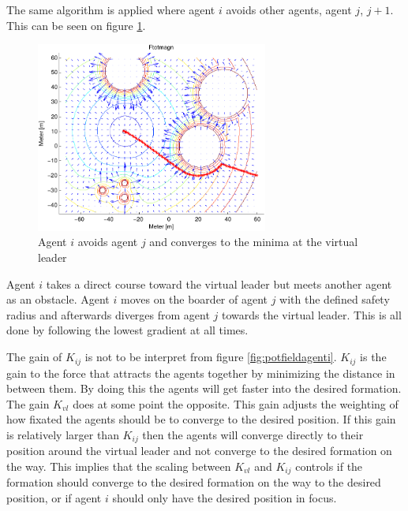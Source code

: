\documentclass[conference]{IEEEtran}
\newcommand{\colwidth}{3in}
\begin{document}

The same algorithm is applied where agent $i$ avoids other agents,
agent $j$, $j+1$. This can be seen on figure \ref{fig:avoidagent}.

\begin{figure}[htbp]
  \includegraphics[width=\colwidth]{fig/ftotmagnfigpdf}
	\caption{Agent $i$ avoids agent $j$ and converges to the minima at
		the virtual leader}
  \label{fig:avoidagent}
\end{figure}

Agent $i$ takes a direct course toward the virtual leader but meets
another agent as an obstacle. Agent $i$ moves on the boarder of agent
$j$ with the defined safety radius and afterwards diverges from agent
$j$ towards the virtual leader. This is all done by following the
lowest gradient at all times.

The gain of $K_{ij}$ is not to be interpret from figure
\ref{fig:potfieldagenti}. $K_{ij}$ is the gain to the force that
attracts the agents together by minimizing the distance in between
them. By doing this the agents will get faster into the desired
formation. The gain $K_{vl}$ does at some point the opposite. This
gain adjusts the weighting of how fixated the agents should be to
converge to the desired position. If this gain is relatively larger
than $K_{ij}$ then the agents will converge directly to their position
around the virtual leader and not converge to the desired formation on
the way. This implies that the scaling between $K_{vl}$ and $K_{ij}$
controls if the formation should converge to the desired formation on
the way to the desired position, or if agent $i$ should only have the
desired position in focus.
\end{document}
